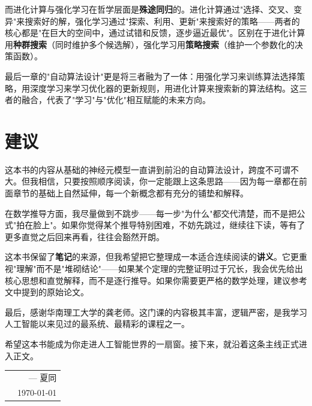 \documentclass[lang=cn,zihao=-4,a4paper,fontset=windows]{beautybook}
\begin{document}
{而进化计算与强化学习在哲学层面是\textbf{殊途同归}的。进化计算通过"选择、交叉、变异"来搜索好的解，强化学习通过"探索、利用、更新"来搜索好的策略——两者的核心都是"在巨大的空间中，通过试错和反馈，逐步逼近最优"。区别在于进化计算用\textbf{种群搜索}（同时维护多个候选解），强化学习用\textbf{策略搜索}（维护一个参数化的决策函数）。

最后一章的"自动算法设计"更是将三者融为了一体：用强化学习来训练算法选择策略，用深度学习来学习优化器的更新规则，用进化计算来搜索新的算法结构。这三者的融合，代表了"学习"与"优化"相互赋能的未来方向。

\section*{建议}

这本书的内容从基础的神经元模型一直讲到前沿的自动算法设计，跨度不可谓不大。但我相信，只要按照顺序阅读，你一定能跟上这条思路——因为每一章都在前面章节的基础上自然延伸，每一个新概念都有充分的铺垫和解释。

在数学推导方面，我尽量做到不跳步——每一步"为什么"都交代清楚，而不是把公式"拍在脸上"。如果你觉得某个推导特别困难，不妨先跳过，继续往下读，等有了更多直觉之后回来再看，往往会豁然开朗。

这本书保留了\textbf{笔记}的来源，但我希望把它整理成一本适合连续阅读的\textbf{讲义}。它更重视"理解"而不是"堆砌结论"——如果某个定理的完整证明过于冗长，我会优先给出核心思想和直觉解释，而不是逐行推导。如果你需要更严格的数学处理，建议参考文中提到的原始论文。

最后，感谢华南理工大学的龚老师。这门课的内容极其丰富，逻辑严密，是我学习人工智能以来见过的最系统、最精彩的课程之一。

希望这本书能成为你走进人工智能世界的一扇窗。接下来，就沿着这条主线正式进入正文。


\hfill
\begin{tabular}{lr}
    &--- 夏同\\ 
    &\today
\end{tabular}
\clearpage}


\tableofcontents\let\cleardoublepage\clearpage

\mainmatter
{}
\end{document}
